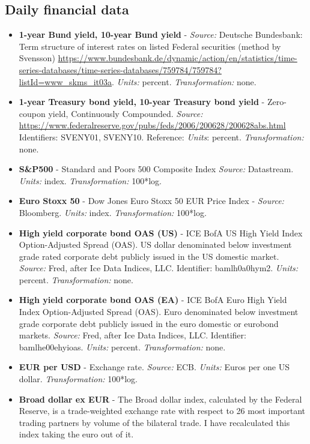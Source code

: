 \documentclass[a4paper,12pt]{article}
\begin{document}
\subsection{Daily financial data}\label{sec: daily data}

\begin{itemize}
\item
\textbf{1-year Bund yield, 10-year Bund yield} - \emph{Source:} Deutsche Bundesbank: Term structure of interest rates on listed Federal securities (method by Svensson) \url{https://www.bundesbank.de/dynamic/action/en/statistics/time-series-databases/time-series-databases/759784/759784?listId=www_skms_it03a}. \emph{Units:} percent. \emph{Transformation:} none.
\item
\textbf{1-year Treasury bond yield, 10-year Treasury bond yield} - Zero-coupon yield, Continuously Compounded. \emph{Source:} 
\url{https://www.federalreserve.gov/pubs/feds/2006/200628/200628abs.html} Identifiers: SVENY01, SVENY10. Reference: 
\cite{Gurkaynak_Sack_Wright_2007} \emph{Units}: percent. \emph{Transformation:} none.
\item
\textbf{S\&P500} - Standard and Poors 500 Composite Index \emph{Source:} Datastream. \emph{Units:} index. \emph{Transformation:} 100*log.
\item
\textbf{Euro Stoxx 50} - Dow Jones Euro Stoxx 50 EUR Price Index - \emph{Source:} Bloomberg. \emph{Units:} index. \emph{Transformation:} 100*log.
\item
\textbf{High yield corporate bond OAS (US)} - ICE BofA US High Yield Index Option-Adjusted Spread (OAS). US dollar denominated below investment grade
rated corporate debt publicly issued in the US domestic market. \emph{Source:} Fred, after Ice Data Indices, LLC. Identifier: bamlh0a0hym2. \emph{Units:} percent. \emph{Transformation:} none.
\item
\textbf{High yield corporate bond OAS (EA)} - ICE BofA Euro High Yield Index Option-Adjusted Spread (OAS). Euro denominated below
investment grade corporate debt publicly issued in the euro domestic  
or eurobond markets. \emph{Source:} Fred, after Ice Data Indices, LLC. Identifier: bamlhe00ehyioas. \emph{Units:} percent. \emph{Transformation:} none.
\item
\textbf{EUR per USD} - Exchange rate. \emph{Source:} ECB. \emph{Units:} Euros per one US dollar. \emph{Transformation:} 100*log.
\item
\textbf{Broad dollar ex EUR} - The Broad dollar index, calculated
by the Federal Reserve, is a trade-weighted exchange rate with respect to 26 most important trading partners by volume of the bilateral trade. I have recalculated this index taking the euro out of it. 

\end{itemize}
\end{document}
